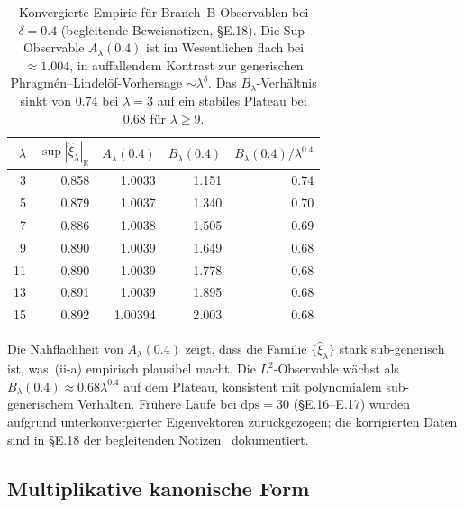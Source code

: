 \documentclass[12pt,a4paper]{article}
\theoremstyle{definition}
\theoremstyle{remark}
\begin{document}
\begin{table}[h]
\centering
\small
\begin{tabular}{r r r r r}
\toprule
$\lambda$ & $\sup|\hat\xi_\lambda|_{\mathbb R}$ & $A_\lambda(0.4)$ & $B_\lambda(0.4)$ & $B_\lambda(0.4)/\lambda^{0.4}$ \\
\midrule
 3 & 0.858 & 1.0033  & 1.151 & 0.74 \\
 5 & 0.879 & 1.0037  & 1.340 & 0.70 \\
 7 & 0.886 & 1.0038  & 1.505 & 0.69 \\
 9 & 0.890 & 1.0039  & 1.649 & 0.68 \\
11 & 0.890 & 1.0039  & 1.778 & 0.68 \\
13 & 0.891 & 1.0039  & 1.895 & 0.68 \\
15 & 0.892 & 1.00394 & 2.003 & 0.68 \\
\bottomrule
\end{tabular}
\caption{Konvergierte Empirie für Branch~B-Observablen bei $\delta = 0.4$
(begleitende Beweisnotizen, \S E.18). Die Sup-Observable $A_\lambda(0.4)$
ist im Wesentlichen flach bei $\approx 1.004$, in auffallendem Kontrast
zur generischen Phragm\'en--Lindel\"of-Vorhersage $\sim \lambda^\delta$.
Das $B_\lambda$-Verhältnis sinkt von $0.74$ bei $\lambda=3$ auf ein
stabiles Plateau bei $0.68$ für $\lambda\ge 9$.}
\label{tab:route-b-empirics}
\end{table}

Die Nahflachheit von $A_\lambda(0.4)$ zeigt, dass die Familie
$\{\hat\xi_\lambda\}$ stark sub-generisch ist, was~(ii-a) empirisch
plausibel macht. Die $L^2$-Observable wächst als
$B_\lambda(0.4)\approx 0.68\lambda^{0.4}$ auf dem Plateau, konsistent
mit polynomialem sub-generischem Verhalten. Frühere Läufe bei
$\mathrm{dps}=30$ (\S E.16--E.17) wurden aufgrund unterkonvergierter
Eigenvektoren zurückgezogen; die korrigierten Daten sind in \S E.18 der
begleitenden Notizen~\cite{Geiger2026evendom} dokumentiert.


\subsection{Multiplikative kanonische Form}
\label{sec:canonical-form}
\end{document}
